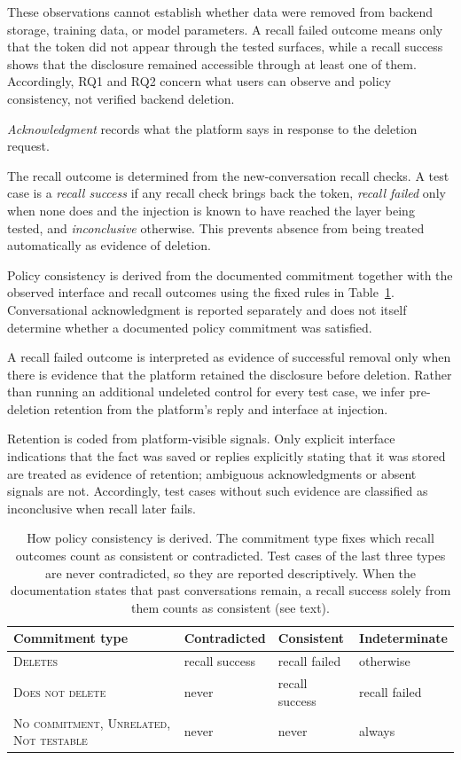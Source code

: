 \documentclass[conference,compsoc]{IEEEtran}
\begin{document}
These observations cannot establish whether data were removed from backend storage, training data, or model parameters. A recall failed outcome means only that the token did not appear through the tested surfaces, while a recall success shows that the disclosure remained accessible through at least one of them. Accordingly, RQ1 and RQ2 concern what users can observe and policy consistency, not verified backend deletion.

\textit{Acknowledgment} records what the platform says in response to the deletion request.

The recall outcome is determined from the new-conversation recall checks. A test case is a \textit{recall success} if any recall check brings back the token, \textit{recall failed} only when none does and the injection is known to have reached the layer being tested, and \textit{inconclusive} otherwise. This prevents absence from being treated automatically as evidence of deletion.

Policy consistency is derived from the documented commitment together with the observed interface and recall outcomes using the fixed rules in Table~\ref{tab:consistency-rule}. Conversational acknowledgment is reported separately and does not itself determine whether a documented policy commitment was satisfied.

A recall failed outcome is interpreted as evidence of successful removal only when there is evidence that the platform retained the disclosure before deletion. Rather than running an additional undeleted control for every test case, we infer pre-deletion retention from the platform's reply and interface at injection.

Retention is coded from platform-visible signals. Only explicit interface indications that the fact was saved or replies explicitly stating that it was stored are treated as evidence of retention; ambiguous acknowledgments or absent signals are not. Accordingly, test cases without such evidence are classified as inconclusive when recall later fails.

\begin{table}[t]
\centering
\caption{How policy consistency is derived. The commitment type fixes
which recall outcomes count as
consistent or contradicted. Test cases of the last three types are never
contradicted, so they are reported descriptively. When the documentation states that past conversations
remain, a recall success solely from them counts as consistent (see text).}
\label{tab:consistency-rule}
\small
\setlength{\tabcolsep}{3.5pt}
\begin{tabular}{@{}p{}p{}p{}p{}@{}}
\toprule
Commitment type & Contradicted & Consistent & Indeterminate \\
\midrule
\textsc{Deletes} & recall success
 & recall failed & otherwise \\
\textsc{Does not delete} & never & recall success & recall failed \\
\textsc{No commitment}, \textsc{Unrelated}, \textsc{Not testable}
 & never & never & always \\
\bottomrule
\end{tabular}
\end{table}
\end{document}
